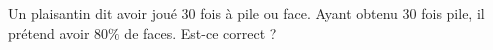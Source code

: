 
\begin{exercice}\label{exoPremiere-0009}

    Un plaisantin dit avoir joué \( 30\) fois à pile ou face. Ayant obtenu \( 30\) fois pile, il prétend avoir \( 80\%\) de faces. Est-ce correct ?

\end{exercice}

